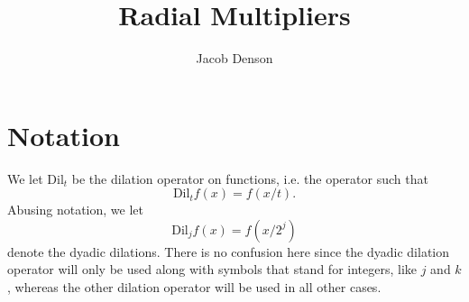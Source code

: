     

\title{Radial Multipliers}
\author{Jacob Denson}



\maketitle

\tableofcontents

\newpage

\chapter{Notation}

We let $\text{Dil}_t$ be the dilation operator on functions, i.e. the operator such that
%
\[ \text{Dil}_t f(x) = f(x/t). \]
%
Abusing notation, we let
%
\[ \text{Dil}_j f(x) = f(x/2^j) \]
%
denote the dyadic dilations. There is no confusion here since the dyadic dilation operator will only be used along with symbols that stand for integers, like $j$ and $k$, whereas the other dilation operator will be used in all other cases.

